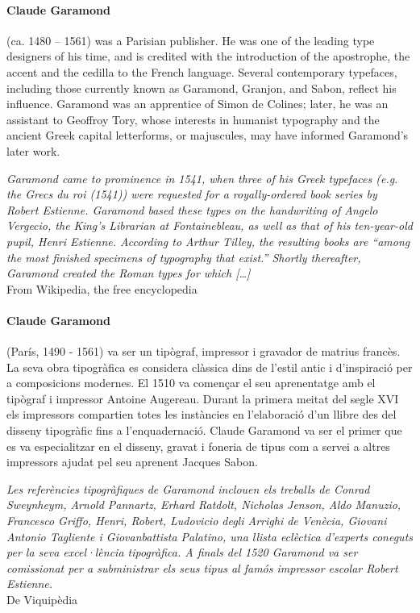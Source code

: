 \documentclass[pagesize,DIV14]{scrartcl}
\begin{document}
\begin{multicols}{2}

\paragraph*{Claude Garamond} (ca. 1480 – 1561) was a Parisian publisher. He was one of the leading type designers  of his time, and is credited with the introduction of the apostrophe, the accent and the cedilla to the French language. Several contemporary typefaces, including those currently known as Garamond, Granjon, and Sabon, reflect his influence. Garamond was an apprentice of Simon de Colines; later, he was an assistant to Geoffroy Tory, whose interests in humanist typography and the ancient Greek capital letterforms, or majuscules, may have informed Garamond’s later work.

\textit{Garamond came to prominence in 1541, when three of his Greek typefaces (e.g. the Grecs du roi (1541)) were requested for a royally-ordered book series by Robert Estienne. Garamond based these types on the handwriting of Angelo Vergecio, the King’s Librarian at Fontainebleau, as well as that of his ten-year-old pupil, Henri Estienne. According to Arthur Tilley, the resulting books are “among the most finished specimens of typography that exist.” Shortly thereafter, Garamond created the Roman types for which […]}\\
{\scriptsize From Wikipedia, the free encyclopedia}

\begin{catalan}
\paragraph*{Claude Garamond} (París, 1490 - 1561) va ser un tipògraf, impressor i gravador de matrius francès. La seva obra tipogràfica es considera clàssica dins de l’estil antic i d'inspiració per a composicions modernes.
El 1510 va començar el seu aprenentatge amb el tipògraf i impressor Antoine Augereau. Durant la primera meitat del segle XVI els impressors compartien totes les instàncies en l’elaboració d’un llibre des del disseny tipogràfic fins a l’enquadernació. Claude Garamond va ser el primer que es va especialitzar en el disseny, gravat i foneria de tipus com a servei a altres impressors ajudat pel seu aprenent Jacques Sabon.\par
\textit{Les referències tipogràfiques de Garamond inclouen els treballs de Conrad Sweynheym, Arnold Pannartz, Erhard Ratdolt, Nicholas Jenson, Aldo Manuzio, Francesco Griffo, Henri, Robert, Ludovicio degli Arrighi de Venècia, Giovani Antonio Tagliente i Giovanbattista Palatino, una llista eclèctica d’experts coneguts per la seva excel·lència tipogràfica. A finals del 1520 Garamond va ser comissionat per a subministrar els seus tipus al famós impressor escolar Robert Estienne.}\\
{\scriptsize De Viquipèdia}
\end{catalan}


\end{multicols}
\end{document}

